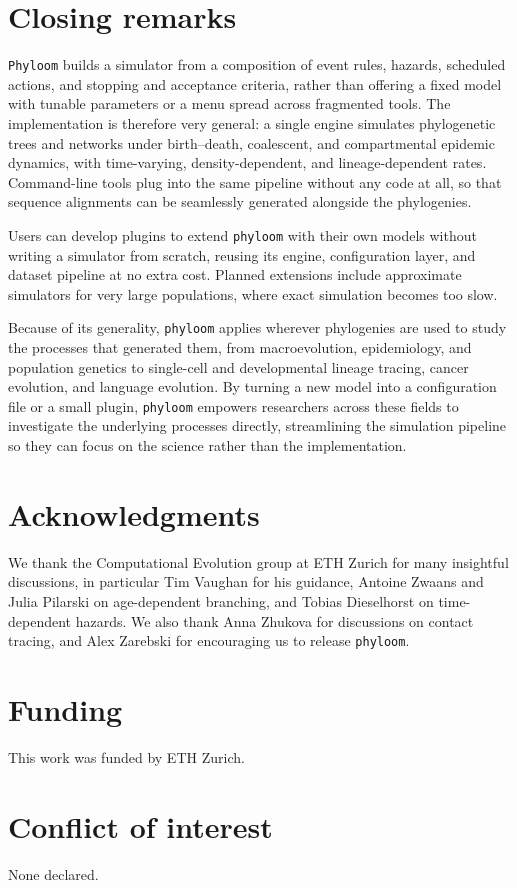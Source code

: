 \documentclass[11pt]{article}
\begin{document}
\section{Closing remarks}

\texttt{Phyloom} builds a simulator from a composition of event rules,
hazards, scheduled actions, and stopping and acceptance criteria, rather than
offering a fixed model with tunable parameters or a menu spread across
fragmented tools. The implementation is therefore very general: a single
engine simulates phylogenetic trees and networks under birth--death,
coalescent, and compartmental epidemic dynamics, with time-varying,
density-dependent, and lineage-dependent rates. Command-line tools plug
into the same pipeline without any code at all, so that sequence
alignments can be seamlessly generated alongside the phylogenies.

Users can develop plugins to extend \texttt{phyloom} with their
own models without writing a simulator from scratch, reusing its engine,
configuration layer, and dataset pipeline at no extra cost.
Planned extensions include approximate simulators for very
large populations, where exact simulation becomes too slow.

Because of its generality, \texttt{phyloom} applies wherever phylogenies are
used to study the processes that generated them, from macroevolution,
epidemiology, and population genetics to single-cell and developmental
lineage tracing, cancer evolution, and language evolution. By turning a new
model into a configuration file or a small plugin, \texttt{phyloom} empowers
researchers across these fields to investigate the underlying processes
directly, streamlining the simulation pipeline so they can focus on
the science rather than the implementation.

\section*{Acknowledgments}
We thank the Computational Evolution group at ETH Zurich for many insightful
discussions, in particular Tim Vaughan for his guidance, Antoine Zwaans and
Julia Pilarski on age-dependent branching, and Tobias Dieselhorst on
time-dependent hazards. We also thank Anna Zhukova for discussions on contact
tracing, and Alex Zarebski for encouraging us to release \texttt{phyloom}.

\section*{Funding}
This work was funded by ETH Zurich.

\section*{Conflict of interest}
None declared.



\end{document}
